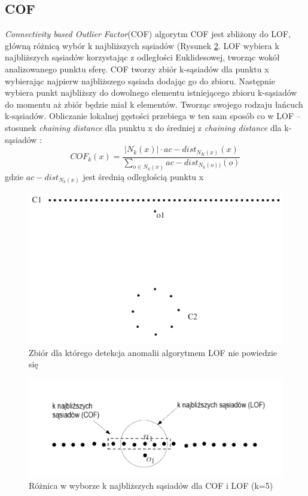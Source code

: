 \subsection{COF}
\textit{Connectivity based Outlier Factor}(COF) \cite{cof} algorytm COF jest zbliżony do LOF, główną różnicą wybór k najbliższych sąsiadów (Rysunek \ref{fig:lcof}. LOF wybiera k najbliższych sąsiadów korzystając z odległości Euklidesowej, tworząc wokół analizowanego punktu sferę. COF tworzy zbiór k-sąsiadów dla punktu x wybierając najpierw najbliższego sąsiada dodając go do zbioru. Następnie wybiera punkt najbliższy do dowolnego elementu istniejącego zbioru k-sąsiadów do momentu aż zbiór będzie miał k elementów. Tworząc swojego rodzaju łańcuch k-sąsiadów. Obliczanie lokalnej gęstości przebiega w ten sam sposób co w LOF -- stosunek \textit{chaining distance} dla punktu x do średniej z \textit{chaining distance} dla k-sąsiadów :
\begin{equation}
    COF_k(x) = \frac{|N_k(x)| \cdot ac-dist_{N_K(x)}(x)}{\sum\limits_{o \in N_k(x)}ac-dist_{N_k(o))}(o)}
\end{equation}
gdzie $ac-dist_{N_k(x)}$ jest średnią odległością punktu x 
\begin{figure}
    \centering
    \includegraphics[width=.6\textwidth]{chapters/MetaOD/images/cof.png}
    \caption{Zbiór dla którego detekcja anomalii algorytmem LOF nie powiedzie się \cite{cof}}
    \label{fig:cof}
\end{figure}

\begin{figure}
    \centering
    \includegraphics[width=.6\textwidth]{chapters/MetaOD/images/lvcof.png}
    \caption{Różnica w wyborze k najbliższych sąsiadów dla COF i LOF (k=5) \cite{chandola2009anomaly}}
    \label{fig:lcof}
\end{figure}

